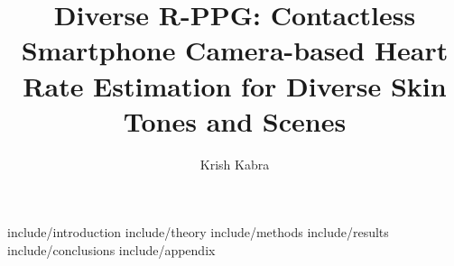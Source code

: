 \documentclass [MS] {uclathes}
\title          {Diverse R-PPG: Contactless Smartphone Camera-based Heart \\
                Rate Estimation for Diverse Skin Tones and Scenes}
\author         {Krish Kabra}
\begin{document}
\makeintropages

%
%
 {include/introduction}  
 {include/theory}  
 {include/methods}  
 {include/results}  
 {include/conclusions}  
\appendix
 {include/appendix}

  


\end{document}
